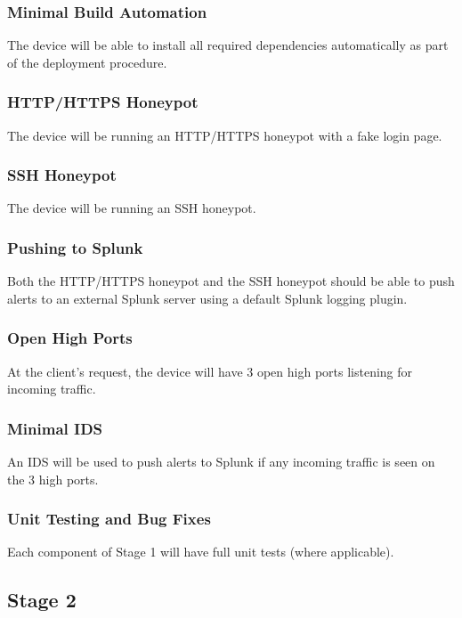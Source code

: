\subsubsection{Minimal Build Automation}

The device will be able to install all required dependencies automatically
as part of the deployment procedure.

\subsubsection{HTTP/HTTPS Honeypot}

The device will be running an HTTP/HTTPS honeypot with a fake login page.

\subsubsection{SSH Honeypot}

The device will be running an SSH honeypot.

\subsubsection{Pushing to Splunk}

Both the HTTP/HTTPS honeypot and the SSH honeypot should be able to push
alerts to an external Splunk server using a default Splunk logging plugin.

\subsubsection{Open High Ports}

At the client's request, the device will have 3 open high ports listening
for incoming traffic.

\subsubsection{Minimal IDS}

An IDS will be used to push alerts to Splunk if any incoming traffic is seen
on the 3 high ports.

\subsubsection{Unit Testing and Bug Fixes}

Each component of Stage 1 will have full unit tests (where applicable).


\subsection{Stage 2}

